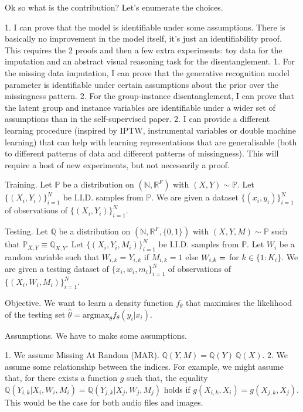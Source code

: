 \documentclass[a4paper,12pt,twoside,openright]{article}
\begin{document}
Ok so what is the contribution? Let's enumerate the choices.

1. I can prove that the model is identifiable under some assumptions. There is basically no improvement in the model itself, it's just an identifiability proof. This requires the 2 proofs and then a few extra experiments: toy data for the imputation and an abstract visual reasoning task for the disentanglement.
    1. For the missing data imputation, I can prove that the generative recognition model parameter is identifiable under certain assumptions about the prior over the missingness pattern.
    2. For the group-instance disentanglement, I can prove that the latent group and instance variables are identifiable under a wider set of assumptions than in the self-supervised paper.
2. I can provide a different learning procedure (inspired by IPTW, instrumental variables or double machine learning) that can help with learning representations that are generalisable (both to different patterns of data and different patterns of missingness). This will require a host of new experiments, but not necessarily a proof.

Training. Let $\mathbb{P}$ be a distribution on $(\mathbb{N}, \mathbb{R}^{F})$ with $(X, Y) \sim \mathbb{P}$. Let $\{(X_i, Y_i)\}_{i=1}^N$ be I.I.D. samples from $\mathbb{P}$. We are given a dataset $\{(x_i, y_i)\}_{i=1}^N$ of observations of $\{(X_i, Y_i)\}_{i=1}^N$.

Testing. Let $\mathbb{Q}$ be a distribution on $(\mathbb{N}, \mathbb{R}^{F}, \{0, 1\})$ with $(X, Y, M) \sim \mathbb{P}$ such that $\mathbb{P}_{X,Y} \equiv \mathbb{Q}_{X, Y}$. Let $\{(X_i, Y_i, M_i)\}_{i=1}^N$ be I.I.D. samples from $\mathbb{P}$. Let $W_i$ be a random variable such that $W_{i,k} = Y_{i,k}$ if $M_{i,k} = 1$ else $W_{i,k} = \empty$ for $k \in \{1:K_i\}$. We are given a testing dataset of $\{x_i, w_i, m_i\}_{i=1}^N$ of observations of $\{(X_i, W_i, M_i)\}_{i=1}^N$.

Objective. We want to learn a density function $f_\theta$ that maximises the likelihood of the testing set $\hat{\theta} = \mathrm{argmax}_\theta f_\theta (y_i | x_i)$.

Assumptions. We have to make some assumptions.

1. We assume Missing At Random (MAR). $\mathbb{Q} (Y, M) = \mathbb{Q} (Y) ~ \mathbb{Q} (X)$.
2. We assume some relationship between the indices. For example, we might assume that, for there exists a function $g$ such that, the equality $\mathbb{Q} (Y_{i,k} | X_i, W_i, M_i) = \mathbb{Q} (Y_{j,k} | X_j, W_j, M_j)$  holds if $g(X_{i,k}, X_i) = g(X_{j,k}, X_j)$. This would be the case for both audio files and images.
\end{document}
